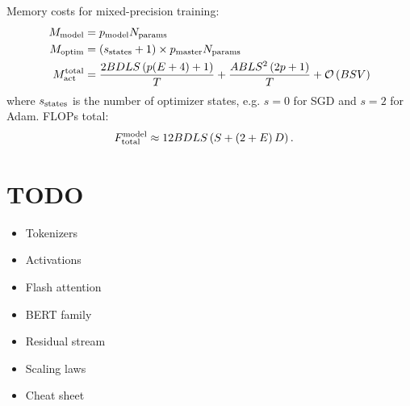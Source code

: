 \documentclass[11pt]{article}
\begin{document}
Memory costs for mixed-precision training:
\begin{align}
	M _{ {\rm model} }                   & =p _{ {\rm model} } N _{ {\rm params} } \nonumber\\
	M _{ {\rm optim} }                   & =  \left ( s _{ {\rm states} }+1 \right) \times p _{ {\rm master } } N _{ {\rm params} } \nonumber\\
	M _{ {\rm act}  } ^{ {\rm  total}  } & =\frac{ 2BDLS   \left ( p(E+4) + 1   \right ) }{ T }
	+ \frac{ ABLS ^{ 2 } \left ( 2p+1\right ) }{ T }  + \mathcal{O} \left( BSV \right)
\end{align}
where $ s _{ {\rm  states} } $ is the number of optimizer states, e.g. $ s=0 $ for SGD and $ s=2 $
for Adam. FLOPs total:
\begin{align}
	F _{ {\rm total}  } ^{ {\rm  model}  } & \approx 12 BDLS \left ( S + \left ( 2+E \right )D \right ) .
\end{align}


\section{TODO}

\begin{itemize}
	\item Tokenizers
	\item Activations
	\item Flash attention
	\item BERT family
	\item Residual stream
	\item Scaling laws
	\item Cheat sheet
\end{itemize}



\end{document}
